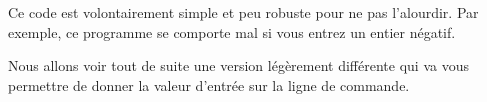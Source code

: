     Ce code est volontairement simple et peu robuste pour ne pas l'alourdir.
Par exemple, ce programme se comporte mal si vous entrez un entier
négatif.

    Nous allons voir tout de suite une version légèrement différente qui va
vous permettre de donner la valeur d'entrée sur la ligne de commande.


    
    
    
